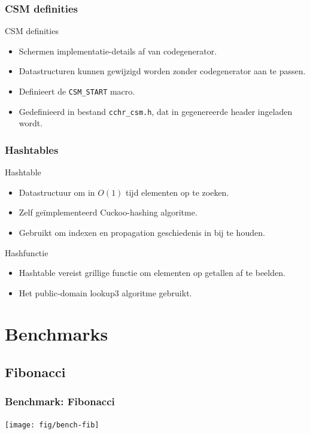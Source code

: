 \documentclass{beamer}
\newcommand{\code}[1]{{\tt #1}}
\begin{document}
\begin{frame}
  \frametitle{CSM definities}
  \begin{block}{CSM definities}
    \begin{itemize}
      \item Schermen implementatie-details af van codegenerator.
      \item Datastructuren kunnen gewijzigd worden zonder codegenerator aan te passen.
      \item Definieert de \code{CSM\_START} macro.
      \item Gedefinieerd in bestand \code{cchr\_csm.h}, dat in gegenereerde header ingeladen wordt.
    \end{itemize}
  \end{block}
\end{frame}

\begin{frame}
  \frametitle{Hashtables}
  \begin{block}{Hashtable}
    \begin{itemize}
      \item Datastructuur om in $O(1)$ tijd elementen op te zoeken.
      \item Zelf ge\"implementeerd Cuckoo-hashing algoritme.
      \item Gebruikt om indexen en propagation geschiedenis in bij te houden.
    \end{itemize}
  \end{block}
  \begin{block}{Hashfunctie}
    \begin{itemize}
      \item Hashtable vereist grillige functie om elementen op getallen af te beelden.
      \item Het public-domain lookup3 algoritme gebruikt.
    \end{itemize}
  \end{block}
\end{frame}

\section{Benchmarks}

\subsection{Fibonacci}

\begin{frame}
  \frametitle{Benchmark: Fibonacci}
  \texttt{[image: fig/bench-fib]}
\end{frame}
\end{document}

